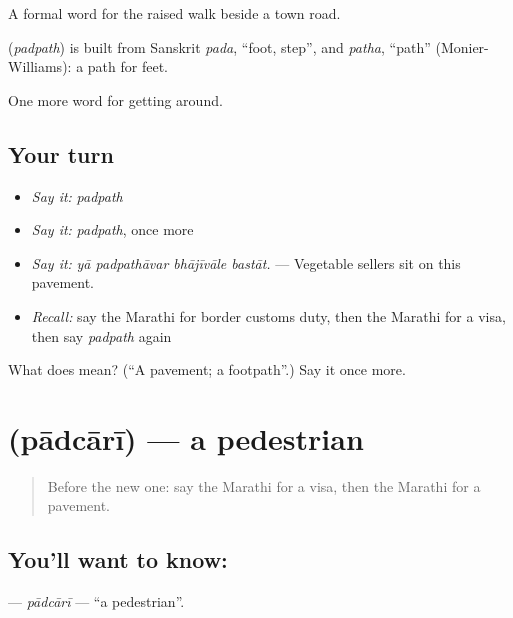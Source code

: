 A formal word for the raised walk beside a town road.

\begin{cousinweb}
\textbf{} (\emph{padpath}) is built from Sanskrit \emph{pada}, \textquotedblleft{}foot, step\textquotedblright{}, and \emph{patha}, \textquotedblleft{}path\textquotedblright{} (Monier-Williams): a path for feet.
\end{cousinweb}

\begin{grammarlens}[title={What you've built}]
One more word for getting around.
\end{grammarlens}

\subsection*{Your turn}
\begin{itemize}
\raggedright
  \item \emph{Say it:} \emph{padpath}
  \item \emph{Say it:} \emph{padpath}, once more
  \item \emph{Say it:} \emph{yā padpathāvar bhājīvāle bastāt.} — Vegetable sellers sit on this pavement.
  \item \emph{Recall:} say the Marathi for border customs duty, then the Marathi for a visa, then say \emph{padpath} again
\end{itemize}

\begin{tcolorbox}[breakable,colback=teal!4,colframe=teal!35!black,title={Before you move on}]
What does  mean? (\textquotedblleft{}A pavement; a footpath\textquotedblright{}.) Say it once more.
\end{tcolorbox}
\section[\texorpdfstring{\mr{पादचारी} (pādcārī)}{पादचारी (pādcārī)}]{ (pādcārī) — a pedestrian}

\label{lesson:MR-C406-padcari}



\begin{quote}
Before the new one: say the Marathi for a visa, then the Marathi for a pavement.
\end{quote}

\subsection*{You'll want to know: }
\textbf{} — \emph{pādcārī} — \textquotedblleft{}a pedestrian\textquotedblright{}.

